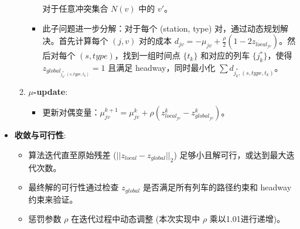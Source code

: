 \documentclass{article}
\begin{document}
\begin{itemize}
\begin{enumerate}
\begin{itemize}
                对于任意冲突集合 $N(v)$ 中的 $v'$。
                \item 此子问题进一步分解：对于每个 (station, type)
                对，通过动态规划解决。首先计算每个 $(j,v)$ 对的成本 $d_{jv} =
                -\mu_{jv} + \frac{\rho}{2} (1 - 2
                z_{local_{jv}})$。然后对每个 $(s, type)$，找到一组时间点
                $\{t_k\}$ 和对应的列车 $\{j_k^*\}$，使得
                $z_{global_{j_k^*, (s,type,t_k)}}=1$ 且满足
                headway，同时最小化 $\sum d_{j_k^*, (s,type,t_k)}$。
            \end{itemize}
            \item \textbf{$\mu$-update}:
            \begin{itemize}
                \item 更新对偶变量：$\mu_{jv}^{k+1} = \mu_{jv}^k + \rho
                (z_{local_{jv}}^k - z_{global_{jv}}^k)$。
            \end{itemize}
        \end{enumerate}
        \item \textbf{收敛与可行性}:
        \begin{itemize}
            \item 算法迭代直至原始残差 ($||z_{local} - z_{global}||_2$) 足够小且解可行，或达到最大迭代次数。
            \item 最终解的可行性通过检查 $z_{global}$ 是否满足所有列车的路径约束和 headway 约束来验证。
            \item 惩罚参数 $\rho$ 在迭代过程中动态调整 (本次实现中 $\rho$ 乘以1.01进行递增)。
        \end{itemize}
    \end{itemize}
\end{document}
